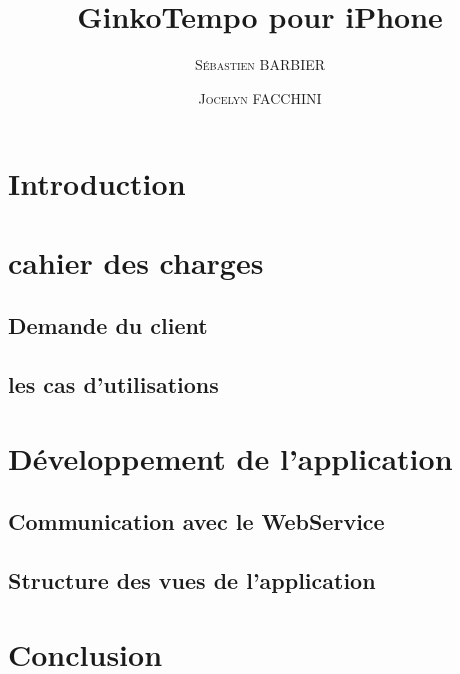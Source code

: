 \documentclass[a4paper, 12pt]{report}
\title{GinkoTempo pour iPhone}
\author{\textsc{S\'{e}bastien BARBIER} \and \textsc{Jocelyn FACCHINI}}
\begin{document}
\maketitle

\section*{Introduction}

\section{cahier des charges}
	\subsection{Demande du client}
	\subsection{les cas d'utilisations}

\section{Développement de l'application}
	\subsection{Communication avec le WebService}
	\subsection{Structure des vues de l'application}
	\subsection{}

\section*{Conclusion}
\end{document}
